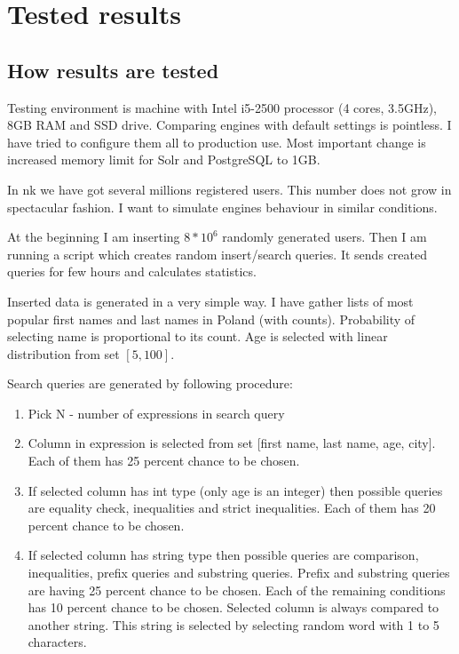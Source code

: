 \documentclass[10pt,a4paper]{article}
\begin{document}
\section{Tested results}

\subsection{How results are tested}

Testing environment is machine with Intel i5-2500 processor (4 cores, 3.5GHz), 8GB RAM and SSD drive. Comparing engines with default settings is pointless. I have tried to configure them all to production use. Most important change is increased memory limit for Solr and PostgreSQL to 1GB.

In nk we have got several millions registered users. This number does not grow in spectacular fashion. I want to simulate engines behaviour in similar conditions. 

At the beginning I am inserting $8 * 10^6$ randomly generated users. Then I am running a script which creates random insert/search queries. It sends created queries for few hours and calculates statistics.

Inserted data is generated in a very simple way. I have gather lists of most popular first names and last names in Poland (with counts). Probability of selecting name is proportional to its count. Age is selected with linear distribution from set $[5, 100]$. 

Search queries are generated by following procedure:
\begin{enumerate}
\item Pick N - number of expressions in search query
\item Column in expression is selected from set [first name, last name, age, city]. Each of them has 25 percent chance to be chosen.
\item If selected column has int type (only age is an integer) then possible queries are equality check, inequalities and strict inequalities. Each of them has 20 percent chance to be chosen.
\item If selected column has string type then possible queries are comparison, inequalities, prefix queries and substring queries. Prefix and substring queries are having 25 percent chance to be chosen. Each of the remaining conditions has 10 percent chance to be chosen. Selected column is always compared to another string. This string is selected by selecting random word with 1 to 5 characters.
\end{enumerate}
\end{document}

